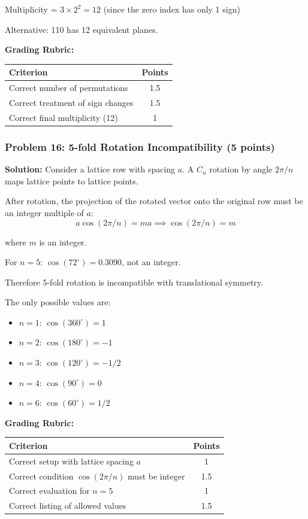 \documentclass[12pt,a4paper]{article}
\begin{document}
Multiplicity = $3 \times 2^2 = 12$ (since the zero index has only 1 sign)

Alternative: {110} has 12 equivalent planes.

\textbf{Grading Rubric:}
\begin{table}[h]
\centering
\begin{tabular}{|p{10cm}|c|}
\hline
\textbf{Criterion} & \textbf{Points} \\
\hline
Correct number of permutations & 1.5 \\
Correct treatment of sign changes & 1.5 \\
Correct final multiplicity (12) & 1 \\
\hline
\end{tabular}
\end{table}

\subsubsection*{Problem 16: 5-fold Rotation Incompatibility (5 points)}
\textbf{Solution:}
Consider a lattice row with spacing $a$. A $C_n$ rotation by angle $2\pi/n$ maps lattice points to lattice points.

After rotation, the projection of the rotated vector onto the original row must be an integer multiple of $a$:
\[a\cos(2\pi/n) = ma \implies \cos(2\pi/n) = m\]

where $m$ is an integer.

For $n=5$: $\cos(72^\circ) = 0.3090$, not an integer.

Therefore 5-fold rotation is incompatible with translational symmetry.

The only possible values are:
\begin{itemize}
    \item $n=1$: $\cos(360^\circ) = 1$
    \item $n=2$: $\cos(180^\circ) = -1$
    \item $n=3$: $\cos(120^\circ) = -1/2$
    \item $n=4$: $\cos(90^\circ) = 0$
    \item $n=6$: $\cos(60^\circ) = 1/2$
\end{itemize}

\textbf{Grading Rubric:}
\begin{table}[h]
\centering
\begin{tabular}{|p{10cm}|c|}
\hline
\textbf{Criterion} & \textbf{Points} \\
\hline
Correct setup with lattice spacing $a$ & 1 \\
Correct condition $\cos(2\pi/n)$ must be integer & 1.5 \\
Correct evaluation for $n=5$ & 1 \\
Correct listing of allowed values & 1.5 \\
\hline
\end{tabular}
\end{table}
\end{document}
